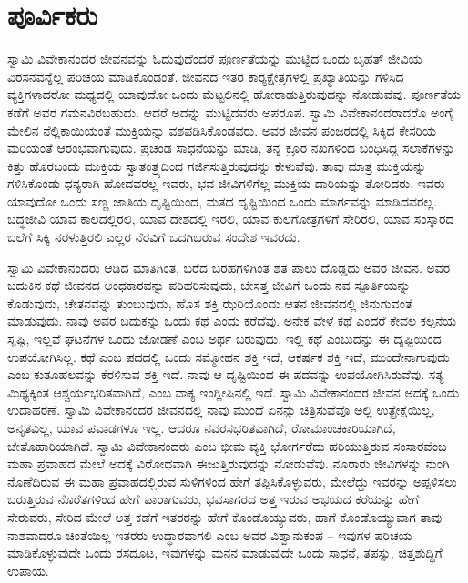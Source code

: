 
\chapter{ಪೂರ್ವಿಕರು}

ಸ್ವಾಮಿ ವಿವೇಕಾನಂದರ ಜೀವನವನ್ನು ಓದುವುದೆಂದರೆ ಪೂರ್ಣತೆಯನ್ನು ಮುಟ್ಟಿದ ಒಂದು ಬೃಹತ್ ಜೀವಿಯ ವಿರಸನವನ್ನೆಲ್ಲ ಪರಿಚಯ ಮಾಡಿಕೊಂಡಂತೆ. ಜೀವನದ ಇತರ ಕಾರ‍್ಯಕ್ಷೇತ್ರ\-ಗಳಲ್ಲಿ ಪ್ರಖ್ಯಾತಿಯನ್ನು ಗಳಿಸಿದ ವ್ಯಕ್ತಿಗಳಾದರೋ ಮಧ್ಯದಲ್ಲಿ ಯಾವುದೋ ಒಂದು ಮೆಟ್ಟಲಿನಲ್ಲಿ ಹೋರಾಡುತ್ತಿರುವುದನ್ನು ನೋಡುವೆವು. ಪೂರ್ಣತೆಯ ಕಡೆಗೆ ಅವರ ಗಮನವಿರಬಹುದು. ಆದರೆ ಅದನ್ನು ಮುಟ್ಟಿದವರು ಅಪರೂಪ. ಸ್ವಾಮಿ ವಿವೇಕಾನಂದರಾದರೊ ಅಂಗೈ ಮೇಲಿನ ನೆಲ್ಲಿಕಾಯಿಯಂತೆ ಮುಕ್ತಿಯನ್ನು ವಶಪಡಿಸಿಕೊಂಡವರು. ಅವರ ಜೀವನ ಪಂಜರದಲ್ಲಿ ಸಿಕ್ಕಿದ ಕೇಸರಿಯ ಮರಿಯಂತೆ ಆರಂಭವಾಗುವುದು. ಪ್ರಚಂಡ ಸಾಧನೆಯನ್ನು ಮಾಡಿ, ತನ್ನ ಕ್ರೂರ ನಖಗಳಿಂದ ಬಂಧಿಸಿದ್ದ ಸಲಾಕೆಗಳನ್ನು ಕಿತ್ತು ಹೊರಬಂದು ಮುಕ್ತಿಯ ಸ್ವಾತಂತ್ರ್ಯದಿಂದ ಗರ್ಜಿಸುತ್ತಿರುವುದನ್ನು ಕೇಳುವೆವು. ತಾವು ಮಾತ್ರ ಮುಕ್ತಿಯನ್ನು ಗಳಿಸಿಕೊಂಡು ಧನ್ಯರಾಗಿ ಹೋದವರಲ್ಲ ಇವರು, ಭವ ಜೀವಿಗಳಿಗೆಲ್ಲ ಮುಕ್ತಿಯ ದಾರಿಯನ್ನು ತೋರಿದರು. ಇವರು ಯಾವುದೋ ಒಂದು ಸಣ್ಣ ಜಾತಿಯ ದೃಷ್ಟಿಯಿಂದ, ಮತದ ದೃಷ್ಟಿಯಿಂದ ಒಂದು ಮಾರ್ಗವನ್ನು ಮಾಡಿದವರಲ್ಲ. ಬದ್ಧಜೀವಿ ಯಾವ ಕಾಲದಲ್ಲಿರಲಿ, ಯಾವ ದೇಶದಲ್ಲಿ ಇರಲಿ, ಯಾವ ಕುಲಗೋತ್ರಗಳಿಗೆ ಸೇರಿರಲಿ, ಯಾವ ಸಂಸ್ಕಾರದ ಬಲೆಗೆ ಸಿಕ್ಕಿ ನರಳುತ್ತಿರಲಿ ಎಲ್ಲರ ನೆರವಿಗೆ ಒದಗಿಬರುವ ಸಂದೇಶ ಇವರದು.

ಸ್ವಾಮಿ ವಿವೇಕಾನಂದರು ಆಡಿದ ಮಾತಿಗಿಂತ, ಬರೆದ ಬರಹಗಳಿಗಿಂತ ಶತ ಪಾಲು ದೊಡ್ಡದು ಅವರ ಜೀವನ. ಅವರ ಬದುಕಿನ ಕಥೆ ಜೀವನದ ಅಂಧಕಾರವನ್ನು ಪರಿಹರಿಸುವುದು, ಬೇಸತ್ತ ಜೀವಿಗೆ ಒಂದು ನವ ಸ್ಪೂರ್ತಿಯನ್ನು ಕೊಡುವುದು, ಚೇತನ\-ವನ್ನು ತುಂಬುವುದು, ಹೊಸ ಶಕ್ತಿ ಝರಿಯೊಂದು ಆತನ ಜೀವನದಲ್ಲಿ ಜಿನುಗುವಂತೆ ಮಾಡುವುದು. ನಾವು ಅವರ ಬದುಕನ್ನು ಒಂದು ಕಥೆ ಎಂದು ಕರೆದೆವು. ಅನೇಕ ವೇಳೆ ಕಥೆ ಎಂದರೆ ಕೇವಲ ಕಲ್ಪನೆಯ ಸೃಷ್ಟಿ, ಇಲ್ಲವೆ ಘಟನೆಗಳ ಒಂದು ಜೋಡಣೆ ಎಂಬ ಅರ್ಥ ಬರುವುದು. ಇಲ್ಲಿ ಕಥೆ ಎಂಬುದನ್ನು ಈ ದೃಷ್ಟಿಯಿಂದ ಉಪಯೋಗಿಸಿಲ್ಲ. ಕಥೆ ಎಂಬ ಪದದಲ್ಲಿ ಒಂದು ಸಮ್ಮೋಹನ ಶಕ್ತಿ ಇದೆ, ಆಕರ್ಷಕ ಶಕ್ತಿ ಇದೆ, ಮುಂದೇನಾಗುವುದು ಎಂಬ ಕುತೂಹಲವನ್ನು ಕೆರಳಿಸುವ ಶಕ್ತಿ ಇದೆ. ನಾವು ಆ ದೃಷ್ಟಿಯಿಂದ ಈ ಪದವನ್ನು ಉಪಯೋಗಿಸಿರುವೆವು. ಸತ್ಯ ಮಿಥ್ಯಕ್ಕಿಂತ ಆಶ್ಚರ್ಯಭರಿತವಾಗಿದೆ, ಎಂಬ ವಾಕ್ಯ ಇಂಗ್ಲೀಷಿನಲ್ಲಿ ಇದೆ. ಸ್ವಾಮಿ ವಿವೇಕಾನಂದರ ಜೀವನ ಅದಕ್ಕೆ ಒಂದು ಉದಾಹರಣೆ. ಸ್ವಾಮಿ ವಿವೇಕಾನಂದರ ಜೀವನದಲ್ಲಿ ನಾವು ಮುಂದೆ ಏನನ್ನು ಚಿತ್ರಿಸುವೆವೊ ಅಲ್ಲಿ ಉತ್ಪ್ರೇಕ್ಷೆಯಿಲ್ಲ, ಅನೃತವಿಲ್ಲ, ಯಾವ ಪವಾಡಗಳೂ ಇಲ್ಲ. ಆದರೂ ನವರಸಭರಿತವಾಗಿದೆ, ರೋಮಾಂಚಕಾರಿಯಾಗಿದೆ, ಚೇತೊಹಾರಿಯಾಗಿದೆ. ಸ್ವಾಮಿ ವಿವೇಕಾನಂದರು ಎಂಬ ಭೀಮ ವ್ಯಕ್ತಿ ಭೋರ್ಗರೆದು ಹರಿಯುತ್ತಿರುವ ಸಂಸಾರವೆಂಬ ಮಹಾ ಪ್ರವಾಹದ ಮೇಲೆ ಅದಕ್ಕೆ ವಿರೋಧವಾಗಿ ಈಜುತ್ತಿರುವುದನ್ನು ನೋಡುವೆವು. ನೂರಾರು ಜೀವಿಗಳನ್ನು ನುಂಗಿ ನೊಣೆದಿರುವ ಈ ಮಹಾ ಪ್ರವಾಹದಲ್ಲಿರುವ ಸುಳಿಗಳಿಂದ ಹೇಗೆ ತಪ್ಪಿಸಿಕೊಳ್ಳುವರು, ಮೇಲೆದ್ದು ಇವರನ್ನು ಅಪ್ಪಳಿಸಲು ಬರುತ್ತಿರುವ ನೊರೆತಗಳಿಂದ ಹೇಗೆ ಪಾರಾಗುವರು, ಭವ\-ಸಾಗರದ ಅತ್ತ ಇರುವ ಅಭಯದ ಕರೆಯನ್ನು ಹೇಗೆ ಸೇರುವರು, ಸೇರಿದ ಮೇಲೆ ಅತ್ತ ಕಡೆಗೆ ಇತರರನ್ನು ಹೇಗೆ ಕೊಂಡೊಯ್ಯುವರು, ಹಾಗೆ ಕೊಂಡೊಯ್ಯುವಾಗ ತಾವು ನಾಶವಾದರೂ ಚಿಂತೆಯಿಲ್ಲ ಇತರರು ಉದ್ಧಾರವಾಗಲಿ ಎಂಬ ಅವರ ವಿಶ್ವಾನುಕಂಪ – ಇವುಗಳ ಪರಿಚಯ ಮಾಡಿಕೊಳ್ಳುವುದೇ ಒಂದು ರಸದೂಟ, ಇವುಗಳನ್ನು ಮನನ ಮಾಡುವುದೇ ಒಂದು ಸಾಧನೆ, ತಪಸ್ಸು, ಚಿತ್ತಶುದ್ಧಿಗೆ ಉಪಾಯ.

